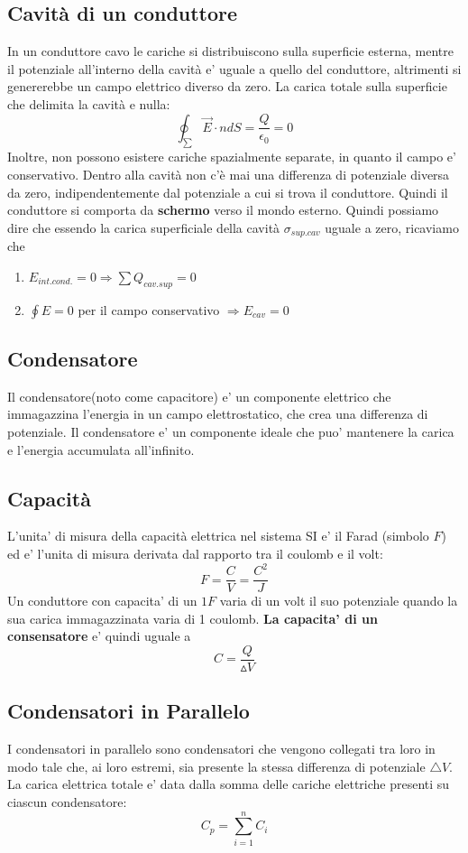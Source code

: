 \documentclass[a4paper, 10pt]{article}
\begin{document}
		\subsection{Cavità di un conduttore} 
			In un conduttore cavo le cariche si distribuiscono sulla superficie esterna, mentre il potenziale all'interno della
			cavità e' uguale a quello del conduttore, altrimenti si genererebbe un campo elettrico diverso da zero. La carica
			totale sulla superficie che delimita la cavità e nulla:
			\[ \oint_{\sum} \overrightarrow{E} \cdot n dS = \frac{Q}{\epsilon_0} = 0 \]
			Inoltre, non possono esistere cariche spazialmente separate, in quanto il campo e' conservativo.
			Dentro alla cavità non c'è mai una differenza di potenziale diversa da zero, indipendentemente 
			dal potenziale a cui si trova il conduttore. Quindi il conduttore si comporta da \textbf{schermo} verso 
			il mondo esterno.
			Quindi possiamo dire che essendo la carica superficiale della cavità $\sigma_{sup.cav}$ uguale a zero, ricaviamo che
			\begin{enumerate}
				\item $E_{int.cond.} = 0 \Rightarrow \sum Q_{cav.sup} = 0$
				\item $\oint E = 0$ per il campo conservativo $\Rightarrow E_{cav} = 0$
			\end{enumerate}	
		\subsection{Condensatore}
			Il condensatore(noto come capacitore) e' un componente elettrico che immagazzina l'energia in un campo elettrostatico, 
			che crea una differenza di potenziale. Il condensatore e' un componente ideale che puo' mantenere la carica e 
			l'energia accumulata all'infinito.		 
		\subsection{Capacità}
			L'unita' di misura della capacità elettrica nel sistema SI e' il Farad (simbolo $F$) ed e' l'unita di 
			misura derivata dal rapporto tra il coulomb e il volt:
			\[ F = \frac{C}{V} = \frac{C^2}{J} \]
			Un conduttore con capacita' di un $1F$ varia di un volt il suo potenziale quando la sua carica immagazzinata varia di
			1 coulomb.
			\textbf{La capacita' di un consensatore} e' quindi uguale a \[ C = \frac{Q}{\vartriangle V} \]
		\subsection{Condensatori in Parallelo}
			I condensatori in parallelo sono condensatori che vengono collegati tra loro in modo tale che, ai loro estremi,
		 	sia presente la stessa differenza di potenziale $\triangle V$. 
		 	La carica elettrica totale e' data dalla somma delle cariche elettriche presenti su ciascun condensatore:
		 	\[ C_p = \sum_{i = 1}^n C_i \]
\end{document}
